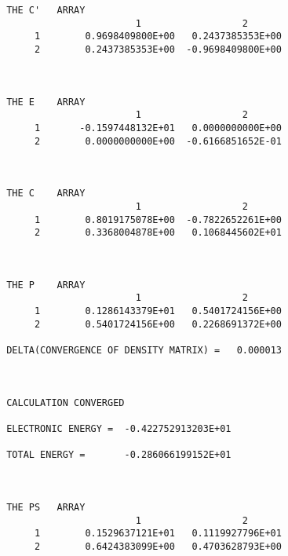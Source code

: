 \begin{verbatim}
 THE C'   ARRAY
                        1                  2
      1        0.9698409800E+00   0.2437385353E+00
      2        0.2437385353E+00  -0.9698409800E+00



 THE E    ARRAY
                        1                  2
      1       -0.1597448132E+01   0.0000000000E+00
      2        0.0000000000E+00  -0.6166851652E-01



 THE C    ARRAY
                        1                  2
      1        0.8019175078E+00  -0.7822652261E+00
      2        0.3368004878E+00   0.1068445602E+01



 THE P    ARRAY
                        1                  2
      1        0.1286143379E+01   0.5401724156E+00
      2        0.5401724156E+00   0.2268691372E+00

 DELTA(CONVERGENCE OF DENSITY MATRIX) =   0.000013



 CALCULATION CONVERGED

 ELECTRONIC ENERGY =  -0.422752913203E+01

 TOTAL ENERGY =       -0.286066199152E+01



 THE PS   ARRAY
                        1                  2
      1        0.1529637121E+01   0.1119927796E+01
      2        0.6424383099E+00   0.4703628793E+00       
\end{verbatim}
  
\newpage
\theendnotes
{}